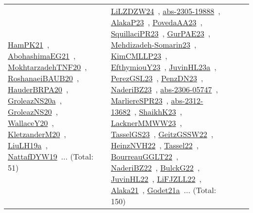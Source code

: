 {\begin{longtable}{lp{3cm}>{\raggedright\arraybackslash}p{6cm}>{\raggedright\arraybackslash}p{6cm}>{\raggedright\arraybackslash}p{8cm}}
\href{../works/HamPK21.pdf}{HamPK21}~\cite{HamPK21}, \href{../works/AbohashimaEG21.pdf}{AbohashimaEG21}~\cite{AbohashimaEG21}, \href{../works/MokhtarzadehTNF20.pdf}{MokhtarzadehTNF20}~\cite{MokhtarzadehTNF20}, \href{../works/RoshanaeiBAUB20.pdf}{RoshanaeiBAUB20}~\cite{RoshanaeiBAUB20}, \href{../works/HauderBRPA20.pdf}{HauderBRPA20}~\cite{HauderBRPA20}, \href{../works/GroleazNS20a.pdf}{GroleazNS20a}~\cite{GroleazNS20a}, \href{../works/GroleazNS20.pdf}{GroleazNS20}~\cite{GroleazNS20}, \href{../works/WallaceY20.pdf}{WallaceY20}~\cite{WallaceY20}, \href{../works/KletzanderM20.pdf}{KletzanderM20}~\cite{KletzanderM20}, \href{../works/LiuLH19a.pdf}{LiuLH19a}~\cite{LiuLH19a}, \href{../works/NattafDYW19.pdf}{NattafDYW19}~\cite{NattafDYW19}... (Total: 51) & \href{../works/LiLZDZW24.pdf}{LiLZDZW24}~\cite{LiLZDZW24}, \href{../works/abs-2305-19888.pdf}{abs-2305-19888}~\cite{abs-2305-19888}, \href{../works/AlakaP23.pdf}{AlakaP23}~\cite{AlakaP23}, \href{../works/PovedaAA23.pdf}{PovedaAA23}~\cite{PovedaAA23}, \href{../works/SquillaciPR23.pdf}{SquillaciPR23}~\cite{SquillaciPR23}, \href{../works/GurPAE23.pdf}{GurPAE23}~\cite{GurPAE23}, \href{../works/Mehdizadeh-Somarin23.pdf}{Mehdizadeh-Somarin23}~\cite{Mehdizadeh-Somarin23}, \href{../works/KimCMLLP23.pdf}{KimCMLLP23}~\cite{KimCMLLP23}, \href{../works/EfthymiouY23.pdf}{EfthymiouY23}~\cite{EfthymiouY23}, \href{../works/JuvinHL23a.pdf}{JuvinHL23a}~\cite{JuvinHL23a}, \href{../works/PerezGSL23.pdf}{PerezGSL23}~\cite{PerezGSL23}, \href{../works/PenzDN23.pdf}{PenzDN23}~\cite{PenzDN23}, \href{../works/NaderiBZ23.pdf}{NaderiBZ23}~\cite{NaderiBZ23}, \href{../works/abs-2306-05747.pdf}{abs-2306-05747}~\cite{abs-2306-05747}, \href{../works/MarliereSPR23.pdf}{MarliereSPR23}~\cite{MarliereSPR23}, \href{../works/abs-2312-13682.pdf}{abs-2312-13682}~\cite{abs-2312-13682}, \href{../works/ShaikhK23.pdf}{ShaikhK23}~\cite{ShaikhK23}, \href{../works/LacknerMMWW23.pdf}{LacknerMMWW23}~\cite{LacknerMMWW23}, \href{../works/TasselGS23.pdf}{TasselGS23}~\cite{TasselGS23}, \href{../works/GeitzGSSW22.pdf}{GeitzGSSW22}~\cite{GeitzGSSW22}, \href{../works/HeinzNVH22.pdf}{HeinzNVH22}~\cite{HeinzNVH22}, \href{../works/Tassel22.pdf}{Tassel22}~\cite{Tassel22}, \href{../works/BourreauGGLT22.pdf}{BourreauGGLT22}~\cite{BourreauGGLT22}, \href{../works/NaderiBZ22.pdf}{NaderiBZ22}~\cite{NaderiBZ22}, \href{../works/BulckG22.pdf}{BulckG22}~\cite{BulckG22}, \href{../works/JuvinHL22.pdf}{JuvinHL22}~\cite{JuvinHL22}, \href{../works/LiFJZLL22.pdf}{LiFJZLL22}~\cite{LiFJZLL22}, \href{../works/Alaka21.pdf}{Alaka21}~\cite{Alaka21}, \href{../works/Godet21a.pdf}{Godet21a}~\cite{Godet21a}... (Total: 150)\\

\end{longtable}}
